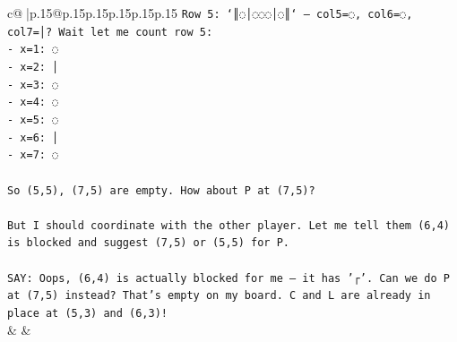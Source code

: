 \documentclass{article}
\begin{document}
{\begin{supertabular}{c@{$\;$}|p{.15\linewidth}@{}p{.15\linewidth}p{.15\linewidth}p{.15\linewidth}p{.15\linewidth}p{.15\linewidth}}
{{{\texttt{Row 5: `║◌│◌◌◌│◌║` — col5=◌, col6=◌, col7=│? Wait let me count row 5:} \\
\texttt{{-} x=1: ◌} \\
\texttt{{-} x=2: │} \\
\texttt{{-} x=3: ◌} \\
\texttt{{-} x=4: ◌} \\
\texttt{{-} x=5: ◌} \\
\texttt{{-} x=6: │} \\
\texttt{{-} x=7: ◌} \\
\\ 
\texttt{So (5,5), (7,5) are empty. How about P at (7,5)?} \\
\\ 
\texttt{But I should coordinate with the other player. Let me tell them (6,4) is blocked and suggest (7,5) or (5,5) for P.} \\
\\ 
\texttt{SAY: Oops, (6,4) is actually blocked for me — it has '┌'. Can we do P at (7,5) instead? That's empty on my board. C and L are already in place at (5,3) and (6,3)!} \\
            }
        }
    }
    & & \\ \\


\end{supertabular}}
\end{document}
